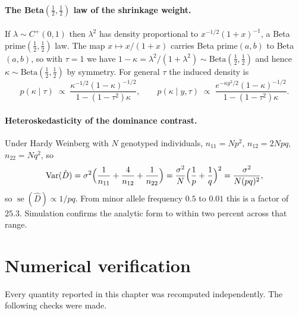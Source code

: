 \paragraph{The Beta$(\tfrac12,\tfrac12)$ law of the shrinkage weight.} If $\lambda\sim C^+(0,1)$ then $\lambda^2$ has density proportional to $x^{-1/2}(1+x)^{-1}$, a
Beta prime$(\tfrac12,\tfrac12)$ law. The map $x\mapsto x/(1+x)$ carries Beta prime$(a,b)$ to
Beta$(a,b)$, so with $\tau=1$ we have $1-\kappa=\lambda^2/(1+\lambda^2)\sim
\text{Beta}(\tfrac12,\tfrac12)$ and hence $\kappa\sim\text{Beta}(\tfrac12,\tfrac12)$ by symmetry.
For general $\tau$ the induced density is
\[
p(\kappa\mid\tau)\;\propto\;\frac{\kappa^{-1/2}(1-\kappa)^{-1/2}}{1-(1-\tau^2)\kappa},
\qquad
p(\kappa\mid y,\tau)\;\propto\;\frac{e^{-\kappa y^2/2}(1-\kappa)^{-1/2}}{1-(1-\tau^2)\kappa}.
\]

\paragraph{Heteroskedasticity of the dominance contrast.} Under Hardy Weinberg with $N$ genotyped individuals, $n_{11}=Np^2$, $n_{12}=2Npq$, $n_{22}=Nq^2$,
so
\[
\operatorname{Var}(\hat D)=\sigma^2\Big(\frac{1}{n_{11}}+\frac{4}{n_{12}}+\frac{1}{n_{22}}\Big)
=\frac{\sigma^2}{N}\Big(\frac1p+\frac1q\Big)^2=\frac{\sigma^2}{N(pq)^2},
\]
so $\operatorname{se}(\hat D)\propto 1/pq$. From minor allele frequency $0.5$ to $0.01$ this is a
factor of $25.3$. Simulation confirms the analytic form to within two percent across that range.

\section{Numerical verification}
\label{ftns:app:num}

Every quantity reported in this chapter was recomputed independently. The following checks were made.


